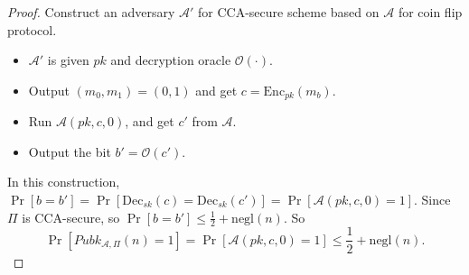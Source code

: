 \documentclass[a4paper]{article}
\newcommand{\negl}{\text{negl}}
\newcommand{\Enc}{\text{Enc}}
\newcommand{\Dec}{\text{Dec}}
\newcommand{\A}{\mathcal{A}}
\newcommand{\OO}{\mathcal{O}}
\newenvironment{problem}[2][Problem]{\begin{trivlist}
\item[\hskip \labelsep {\bfseries #1}\hskip \labelsep {\bfseries #2.}]}{\end{trivlist}}
\begin{document}
\begin{problem}{11.8}
\begin{proof}
Construct an adversary $\A'$ for CCA-secure scheme based on $\A$ for coin flip protocol.\par
\begin{itemize}
    \item $\A'$ is given $pk$ and decryption oracle $\OO(\cdot)$.
    \item Output $(m_0,m_1)=(0,1)$ and get $c=\Enc_{pk}(m_b)$.
    \item Run $\A(pk,c,0)$, and get $c'$ from $\A$.
    \item Output the bit $b'=\OO(c')$.
\end{itemize}\par
In this construction, $\Pr[b=b']=\Pr[\Dec_{sk}(c)=\Dec_{sk}(c')]=\Pr[\A(pk,c,0)=1]$. Since $\Pi$ is CCA-secure, so $\Pr[b=b']\le\frac12+\negl(n)$. So $$\Pr[Pubk_{\A,\Pi}(n)=1]=\Pr[\A(pk,c,0)=1]\le\frac12+\negl(n).$$
\end{proof}
\end{problem}
\end{document}
